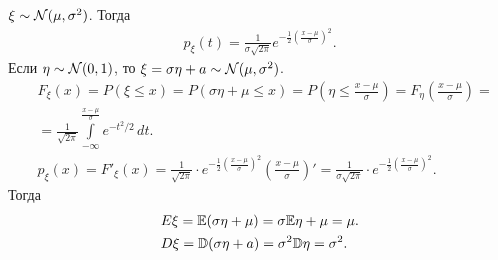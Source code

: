 \documentclass[../main.tex]{subfiles}
\begin{document}
   \begin{exmpl}
    $ \xi \sim \mathcal N(\mu,\sigma^{2}) $. Тогда
    \begin{align*}
     p_\xi(t) = \frac{1}{\sigma\sqrt{2\pi}} e^{-\frac{1}{2} \left( \frac{x-\mu}{\sigma} \right)^{2}}.
    \end{align*} Если $ \eta \sim \mathcal N(0,1) $, то $ \xi = \sigma \eta + a \sim \mathcal N(\mu,\sigma^{2}) $.
    \begin{align*}
     &F_\xi(x) = P(\xi \leqslant x) = P(\sigma\eta + \mu \leqslant x) = P\left(\eta \leqslant \frac{x-\mu}{\sigma}\right) = F_{\eta}\left( \frac{x-\mu}{\sigma} \right) = \\
     &= \frac{1}{\sqrt{2\pi}} \int\limits_{-\infty}^{\frac{x-\mu}{\sigma}} e^{-t^{2} / 2}\,dt. \\
     &p_\xi(x) = F'_\xi(x) = \frac{1}{\sqrt{2\pi}} \cdot e^{-\frac{1}{2} \left( \frac{x-\mu}{\sigma} \right)^{2}} \left( \frac{x-\mu}{\sigma} \right)' = \frac{1}{\sigma\sqrt{2\pi}} \cdot e^{-\frac{1}{2} \left( \frac{x-\mu}{\sigma} \right)^{2}}.
    \end{align*} Тогда
    \begin{align*}
     &E\xi = \mathbb E(\sigma \eta + \mu)  = \sigma \mathbb E\eta + \mu = \mu.\\
     &D\xi = \mathbb D(\sigma\eta + a) = \sigma^{2}\mathbb D\eta = \sigma^{2}.
    \end{align*} 
   \end{exmpl}
\end{document}
